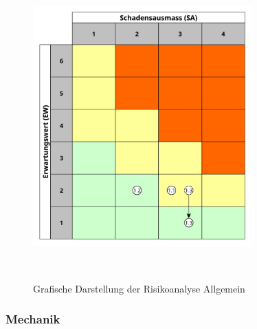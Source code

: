 \documentclass[main.tex]{subfiles} %
\begin{document}
\begin{figure}[H]
    \centering
    \includegraphics[width=0.75\textwidth]{./fig_Projektmanagement/Diagramm_Risiko_allg.pdf}
    \caption{Grafische Darstellung der Risikoanalyse Allgemein}~\label{fig:Diagramm_Risiko_allg}
\end{figure}


\subsubsection*{Mechanik}
\end{document}
